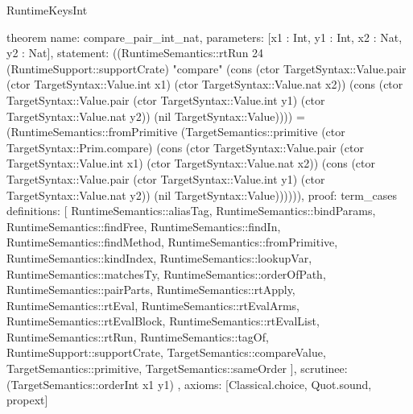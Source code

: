 \begin{lexlean}{RuntimeKeysInt}
\begin{semanticmodule}
theorem{
  name: compare_pair_int_nat,
  parameters: [x1 : Int, y1 : Int, x2 : Nat, y2 : Nat],
  statement: ((RuntimeSemantics::rtRun 24 (RuntimeSupport::supportCrate) "compare" (cons (ctor TargetSyntax::Value.pair (ctor TargetSyntax::Value.int x1) (ctor TargetSyntax::Value.nat x2)) (cons (ctor TargetSyntax::Value.pair (ctor TargetSyntax::Value.int y1) (ctor TargetSyntax::Value.nat y2)) (nil TargetSyntax::Value)))) = (RuntimeSemantics::fromPrimitive (TargetSemantics::primitive (ctor TargetSyntax::Prim.compare) (cons (ctor TargetSyntax::Value.pair (ctor TargetSyntax::Value.int x1) (ctor TargetSyntax::Value.nat x2)) (cons (ctor TargetSyntax::Value.pair (ctor TargetSyntax::Value.int y1) (ctor TargetSyntax::Value.nat y2)) (nil TargetSyntax::Value)))))),
  proof: term_cases{
    definitions: [
      RuntimeSemantics::aliasTag,
      RuntimeSemantics::bindParams,
      RuntimeSemantics::findFree,
      RuntimeSemantics::findIn,
      RuntimeSemantics::findMethod,
      RuntimeSemantics::fromPrimitive,
      RuntimeSemantics::kindIndex,
      RuntimeSemantics::lookupVar,
      RuntimeSemantics::matchesTy,
      RuntimeSemantics::orderOfPath,
      RuntimeSemantics::pairParts,
      RuntimeSemantics::rtApply,
      RuntimeSemantics::rtEval,
      RuntimeSemantics::rtEvalArms,
      RuntimeSemantics::rtEvalBlock,
      RuntimeSemantics::rtEvalList,
      RuntimeSemantics::rtRun,
      RuntimeSemantics::tagOf,
      RuntimeSupport::supportCrate,
      TargetSemantics::compareValue,
      TargetSemantics::primitive,
      TargetSemantics::sameOrder
    ],
    scrutinee: (TargetSemantics::orderInt x1 y1)
  },
  axioms: [Classical.choice, Quot.sound, propext]
}


\end{semanticmodule}
\end{lexlean}
